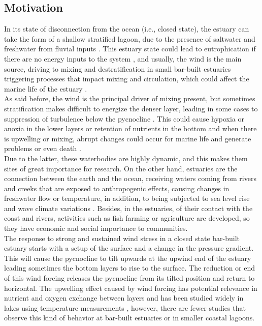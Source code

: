 \documentclass[tesis.tex]{subfiles}
\begin{document}
\subsection{Motivation}

In its state of disconnection from the ocean (i.e., closed state), the estuary can take the form of a shallow stratified lagoon, due to the presence of saltwater and freshwater from fluvial inputs \citep{Behrens2016}. This estuary state could lead to eutrophication if there are no energy inputs to the system \citep{nunes2014responses}, and usually, the wind is the main source, driving to mixing and destratification in small bar-built estuaries \citep{Gale2006} triggering processes that impact mixing and circulation, which could affect the marine life of the estuary \citep{marti2008relating}. \\

As said before, the wind is the principal driver of mixing present, but sometimes stratification makes difficult to energize the denser layer, leading in some cases to suppression of turbulence below the pycnocline \citep{Cousins2010}. This could cause hypoxia or anoxia in the lower layers \citep{Kelly2018} or retention of nutrients in the bottom \citep{Cousins2010} and when there is upwelling or mixing, abrupt changes could occur for marine life and generate problems or even death \citep{marti2008relating}.\\  

Due to the latter, these waterbodies are highly dynamic, and this makes them sites of great importance for research. On the other hand, estuaries are the connection between the earth and the ocean, receiving waters coming from rivers and creeks that are exposed to anthropogenic effects, causing changes in freshwater flow or temperature, in addition, to being subjected to sea level rise and wave climate variations \citep{grez2020evidence, holt2010potential, thorne2021wetlands}. Besides, in the estuaries, of their contact with the coast and rivers, activities such as fish farming or agriculture are developed, so they have economic and social importance to communities. \\

The response to strong and sustained wind stress in a closed state bar-built estuary starts with a setup of the surface and a change in the pressure gradient. This will cause the pycnocline to tilt upwards at the upwind end of the estuary leading sometimes the bottom layers to rise to the surface. The reduction or end of this wind forcing releases the pycnocline from its tilted position and return to horizontal. The upwelling effect caused by wind forcing has potential relevance in nutrient and oxygen exchange between layers \citep{Kelly2018} and has been studied widely in lakes using temperature measurements \citep{Coman2012, delafuente2010strong, roberts2021setup}, however, there are fewer studies that observe this kind of behavior at bar-built estuaries or in smaller coastal lagoons. \\
\end{document}
